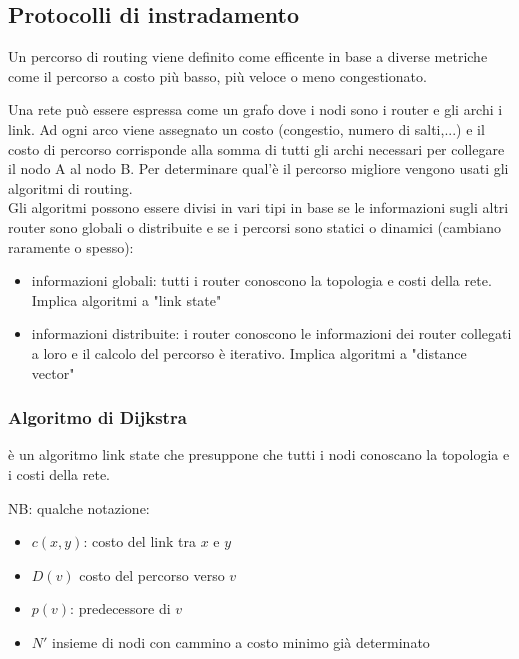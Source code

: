 \documentclass[12pt, a4paper]{article}
\begin{document}
\subsection{Protocolli di instradamento}
Un percorso di routing viene definito come efficente in base a diverse metriche come il percorso a costo più basso, 
più veloce o meno congestionato.

Una rete può essere espressa come un grafo dove i nodi sono i router e gli archi i link. Ad ogni arco viene assegnato 
un costo (congestio, numero di salti,...) e il costo di percorso corrisponde alla somma di tutti gli archi necessari 
per collegare il nodo A al nodo B. Per determinare qual'è il percorso migliore vengono usati gli algoritmi di routing.\\
Gli algoritmi possono essere divisi in vari tipi in base se le informazioni sugli altri router sono globali o
distribuite e se i percorsi sono statici o dinamici (cambiano raramente o spesso):
\begin{itemize}
    \item informazioni globali: tutti i router conoscono la topologia e costi della rete. Implica algoritmi a 
    "link state"
    \item informazioni distribuite: i router conoscono le informazioni dei router collegati a loro e il calcolo del
    percorso è iterativo. Implica algoritmi a "distance vector"
\end{itemize}

\subsubsection{Algoritmo di Dijkstra}
è un algoritmo link state che presuppone che tutti i nodi conoscano la topologia e i costi della rete.

NB: qualche notazione:
\begin{itemize}
    \item $c(x,y)$: costo del link tra $x$ e $y$
    \item $D(v)$ costo del percorso verso $v$
    \item $p(v)$: predecessore di $v$ 
    \item $N'$ insieme di nodi con cammino a costo minimo già determinato
\end{itemize}
\end{document}
